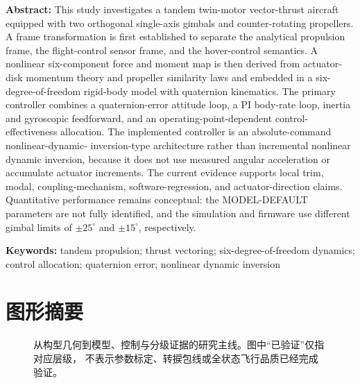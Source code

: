 \begin{titlepage}
\begin{minipage}{0.92\textwidth}
\vspace{1.2em}
\textbf{Abstract:}
This study investigates a tandem twin-motor vector-thrust aircraft equipped with two orthogonal
single-axis gimbals and counter-rotating propellers. A frame transformation is first established to
separate the analytical propulsion frame, the flight-control sensor frame, and the hover-control
semantics. A nonlinear six-component force and moment map is then derived from actuator-disk
momentum theory and propeller similarity laws and embedded in a six-degree-of-freedom rigid-body
model with quaternion kinematics. The primary controller combines a quaternion-error attitude loop,
a PI body-rate loop, inertia and gyroscopic feedforward, and an operating-point-dependent control-
effectiveness allocation. The implemented controller is an absolute-command nonlinear-dynamic-
inversion-type architecture rather than incremental nonlinear dynamic inversion, because it does not
use measured angular acceleration or accumulate actuator increments. The current evidence supports
local trim, modal, coupling-mechanism, software-regression, and actuator-direction claims. Quantitative
performance remains conceptual: the MODEL-DEFAULT parameters are not fully identified, and the
simulation and firmware use different gimbal limits of $\pm25^\circ$ and $\pm15^\circ$, respectively.

\vspace{0.6em}
\noindent\textbf{Keywords:} tandem propulsion; thrust vectoring; six-degree-of-freedom dynamics;
control allocation; quaternion error; nonlinear dynamic inversion
\end{minipage}
\end{titlepage}

\clearpage
\section*{图形摘要}
\begin{figure}[H]
\centering

\caption*{从构型几何到模型、控制与分级证据的研究主线。图中“已验证”仅指对应层级，
不表示参数标定、转捩包线或全状态飞行品质已经完成验证。}
\end{figure}

\clearpage
{}
\tableofcontents
\thispagestyle{plain}
\clearpage

\setcounter{page}{1}


\clearpage

\clearpage

\clearpage

\clearpage

\clearpage

\clearpage

\clearpage

\clearpage

\clearpage

\clearpage

\clearpage

\clearpage


